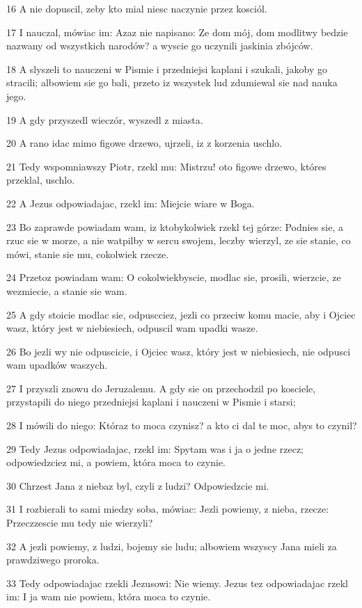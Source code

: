 \par 16 A nie dopuscil, zeby kto mial niesc naczynie przez kosciól.
\par 17 I nauczal, mówiac im: Azaz nie napisano: Ze dom mój, dom modlitwy bedzie nazwany od wszystkich narodów? a wyscie go uczynili jaskinia zbójców.
\par 18 A slyszeli to nauczeni w Pismie i przedniejsi kaplani i szukali, jakoby go stracili; albowiem sie go bali, przeto iz wszystek lud zdumiewal sie nad nauka jego.
\par 19 A gdy przyszedl wieczór, wyszedl z miasta.
\par 20 A rano idac mimo figowe drzewo, ujrzeli, iz z korzenia uschlo.
\par 21 Tedy wspomniawszy Piotr, rzekl mu: Mistrzu! oto figowe drzewo, któres przeklal, uschlo.
\par 22 A Jezus odpowiadajac, rzekl im: Miejcie wiare w Boga.
\par 23 Bo zaprawde powiadam wam, iz ktobykolwiek rzekl tej górze: Podnies sie, a rzuc sie w morze, a nie watpilby w sercu swojem, leczby wierzyl, ze sie stanie, co mówi, stanie sie mu, cokolwiek rzecze.
\par 24 Przetoz powiadam wam: O cokolwiekbyscie, modlac sie, prosili, wierzcie, ze wezmiecie, a stanie sie wam.
\par 25 A gdy stoicie modlac sie, odpuscciez, jezli co przeciw komu macie, aby i Ojciec wasz, który jest w niebiesiech, odpuscil wam upadki wasze.
\par 26 Bo jezli wy nie odpuscicie, i Ojciec wasz, który jest w niebiesiech, nie odpusci wam upadków waszych.
\par 27 I przyszli znowu do Jeruzalemu. A gdy sie on przechodzil po kosciele, przystapili do niego przedniejsi kaplani i nauczeni w Pismie i starsi;
\par 28 I mówili do niego: Któraz to moca czynisz? a kto ci dal te moc, abys to czynil?
\par 29 Tedy Jezus odpowiadajac, rzekl im: Spytam was i ja o jedne rzecz; odpowiedzciez mi, a powiem, która moca to czynie.
\par 30 Chrzest Jana z niebaz byl, czyli z ludzi? Odpowiedzcie mi.
\par 31 I rozbierali to sami miedzy soba, mówiac: Jezli powiemy, z nieba, rzecze: Przeczzescie mu tedy nie wierzyli?
\par 32 A jezli powiemy, z ludzi, bojemy sie ludu; albowiem wszyscy Jana mieli za prawdziwego proroka.
\par 33 Tedy odpowiadajac rzekli Jezusowi: Nie wiemy. Jezus tez odpowiadajac rzekl im: I ja wam nie powiem, która moca to czynie.

